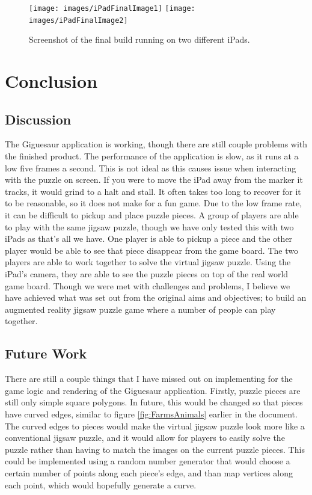 \documentclass{article}
\begin{document}
\begin{figure}[ht]
\begin{center}
\texttt{[image: images/iPadFinalImage1]}
\texttt{[image: images/iPadFinalImage2]}
\caption{Screenshot of the final build running on two different iPads.}
\label{fig:iPadFinal}
\end{center}
\end{figure}


\section{Conclusion}

\subsection{Discussion}
The Giguesaur application is working, though there are still couple problems
with the finished product. The performance of the application is slow, as it
runs at a low five frames a second. This is not ideal as this causes issue when
interacting with the puzzle on screen. If you were to move the iPad away from
the marker it tracks, it would grind to a halt and stall. It often takes too
long to recover for it to be reasonable, so it does not make for a fun game. Due
to the low frame rate, it can be difficult to pickup and place puzzle pieces. A
group of players are able to play with the same jigsaw puzzle, though we have
only tested this with two iPads as that's all we have. One player is able to
pickup a piece and the other player would be able to see that piece disappear
from the game board. The two players are able to work together to solve the
virtual jigsaw puzzle. Using the iPad's camera, they are able to see the puzzle
pieces on top of the real world game board. Though we were met with challenges
and problems, I believe we have achieved what was set out from the original aims
and objectives; to build an augmented reality jigsaw puzzle game where a number
of people can play together. 

\subsection{Future Work}
There are still a couple things that I have missed out on implementing for the
game logic and rendering of the Giguesaur application. Firstly, puzzle pieces
are still only simple square polygons. In future, this would be changed so that
pieces have curved edges, similar to figure \ref{fig:FarmsAnimals} earlier in
the document. The curved edges to pieces would make the virtual jigsaw puzzle
look more like a conventional jigsaw puzzle, and it would allow for players to
easily solve the puzzle rather than having to match the images on the current
puzzle pieces. This could be implemented using a random number generator that
would choose a certain number of points along each piece's edge, and than map
vertices along each point, which would hopefully generate a curve.\\
\end{document}
